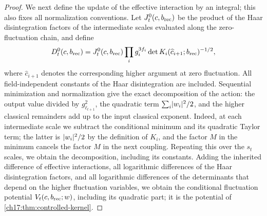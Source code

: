 \begin{proof}
We next define the update of the effective interaction by an integral; this also fixes all normalization conventions. Let $J_t^{0}(c,b_{\mathrm{rec}})$ be the product of the Haar disintegration factors of the intermediate scales evaluated along the zero-fluctuation chain, and define
\begin{equation}\label{ch18:eq:reference-determinant}
 D_t^{0}(c,b_{\mathrm{rec}})=J_t^{0}(c,b_{\mathrm{rec}})
       \prod_i g_i^{3f_i}
       \det K_i(\widehat c_{i+1};b_{\mathrm{rec}})^{-1/2},
\end{equation}
where $\widehat c_{i+1}$ denotes the corresponding higher argument at zero fluctuation. All field-independent constants of the Haar disintegration are included. Sequential minimization and normalization give the exact decomposition of the action: the output value divided by $g_{\ell_{t+1}}^2$, the quadratic term $\sum_i\lvert w_i\rvert^2/2$, and the higher classical remainders add up to the input classical exponent. Indeed, at each intermediate scale we subtract the conditional minimum and its quadratic Taylor term; the latter is $\lvert w_i\rvert^2/2$ by the definition of $K_i$, and the factor $M$ in the minimum cancels the factor $M$ in the next coupling. Repeating this over the $s_t$ scales, we obtain the decomposition, including its constants. Adding the inherited difference of effective interactions, all logarithmic differences of the Haar disintegration factors, and all logarithmic differences of the determinants that depend on the higher fluctuation variables, we obtain the conditional fluctuation potential $V_t(c,b_{\mathrm{rec}};w)$, including its quadratic part; it is the potential of \cref{ch17:thm:controlled-kernel}.


\end{proof}
